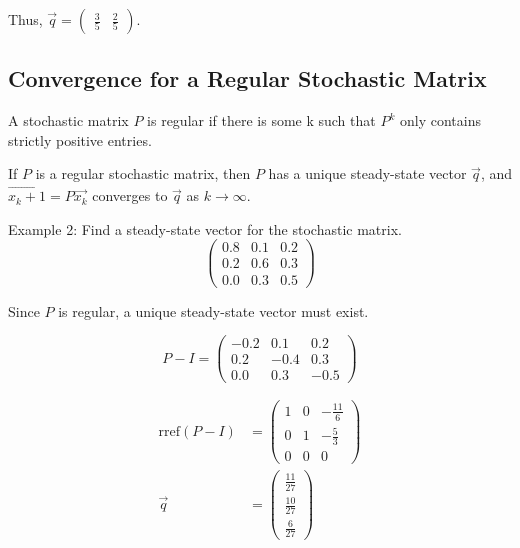 \noindent
Thus, \(\Vec{q} = \begin{pmatrix}
    \frac{3}{5} & \frac{2}{5}
\end{pmatrix}\).

\subsection{Convergence for a Regular Stochastic Matrix}
\begin{definition}
    A stochastic matrix \(P\) is regular if there is some k such that \(P^k\) only contains strictly positive entries.
\end{definition}
\begin{theorem}
    If \(P\) is a regular stochastic matrix, then \(P\) has a unique steady-state vector \(\Vec{q}\), and \(\Vec{x_k+1}=P\Vec{x_k}\) converges to \(\Vec{q}\) as \(k \rightarrow \infty\).
\end{theorem}

\noindent
Example 2: Find a steady-state vector for the stochastic matrix.
\begin{equation}
    \begin{pmatrix}
        0.8 & 0.1 & 0.2 \\
        0.2 & 0.6 & 0.3 \\
        0.0 & 0.3 & 0.5
    \end{pmatrix}
\end{equation}

\noindent
Since \(P\) is regular, a unique steady-state vector must exist.

\begin{equation}
    P-I = \begin{pmatrix}
        -0.2 & 0.1 & 0.2 \\
        0.2 & -0.4 & 0.3 \\
        0.0 & 0.3 & -0.5
    \end{pmatrix}
\end{equation}

\begin{align}
    \text{rref}(P-I) &= \begin{pmatrix}
        1 & 0 & -\frac{11}{6} \\
        0 & 1 & -\frac{5}{3} \\
        0 & 0 & 0
    \end{pmatrix} \\
    \Vec{q} &= \begin{pmatrix}
        \frac{11}{27} \\
        \frac{10}{27} \\
        \frac{6}{27}
    \end{pmatrix}
\end{align}